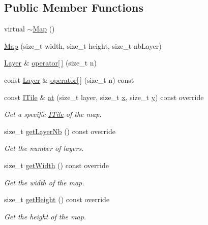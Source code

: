 \subsection*{Public Member Functions}
\begin{DoxyCompactItemize}
\item 
virtual \hyperlink{classarcade_1_1_map_a5a07c82ff294b43e2091ad54f7a432f0}{$\sim$\+Map} ()
\item 
\hyperlink{classarcade_1_1_map_afc77786cf678dbf7fcf441889968ce13}{Map} (size\+\_\+t width, size\+\_\+t height, size\+\_\+t nb\+Layer)
\item 
\hyperlink{classarcade_1_1_layer}{Layer} \& \hyperlink{classarcade_1_1_map_afa393c5333d4cd1d24a1e145b4800769}{operator\mbox{[}$\,$\mbox{]}} (size\+\_\+t n)
\item 
const \hyperlink{classarcade_1_1_layer}{Layer} \& \hyperlink{classarcade_1_1_map_a83e8988805a8d8cd410080d342964c5f}{operator\mbox{[}$\,$\mbox{]}} (size\+\_\+t n) const
\item 
const \hyperlink{classarcade_1_1_i_tile}{I\+Tile} \& \hyperlink{classarcade_1_1_map_a8032d00c437cad8cedb646a0a1eb4bb1}{at} (size\+\_\+t layer, size\+\_\+t \hyperlink{include_2_protocol_8hpp_a4dde988b1b2adba65ae3efa69f65d960}{x}, size\+\_\+t \hyperlink{include_2_protocol_8hpp_ab0580f504a7428539be299fa71565f30}{y}) const override
\begin{DoxyCompactList}\small\item\em Get a specific \hyperlink{classarcade_1_1_i_tile}{I\+Tile} of the map. \end{DoxyCompactList}\item 
size\+\_\+t \hyperlink{classarcade_1_1_map_a75d832d23939401ffe062b461839bc8d}{get\+Layer\+Nb} () const override
\begin{DoxyCompactList}\small\item\em Get the number of layers. \end{DoxyCompactList}\item 
size\+\_\+t \hyperlink{classarcade_1_1_map_af48996ef9fc333a7c9ab6a9f2ddb7b56}{get\+Width} () const override
\begin{DoxyCompactList}\small\item\em Get the width of the map. \end{DoxyCompactList}\item 
size\+\_\+t \hyperlink{classarcade_1_1_map_a914cc33687ccf159cc2876fc1d52657d}{get\+Height} () const override
\begin{DoxyCompactList}\small\item\em Get the height of the map. \end{DoxyCompactList}\item 

\end{DoxyCompactItemize}
